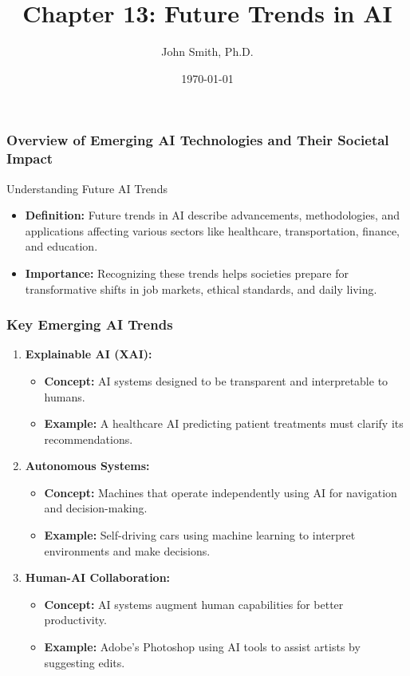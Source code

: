 \documentclass[aspectratio=169]{beamer}
\title[Future Trends in AI]{Chapter 13: Future Trends in AI}
\author[J. Smith]{John Smith, Ph.D.}
\institute[University Name]{
  Department of Computer Science\\
  University Name\\
  \vspace{0.3cm}
  Email: email@university.edu\\
  Website: www.university.edu
}
\date{\today}
\begin{document}
\frame{\titlepage}

\begin{frame}[fragile]
    \titlepage
\end{frame}

\begin{frame}[fragile]
    \frametitle{Overview of Emerging AI Technologies and Their Societal Impact}
    \begin{block}{Understanding Future AI Trends}
        \begin{itemize}
            \item \textbf{Definition:} Future trends in AI describe advancements, methodologies, and applications affecting various sectors like healthcare, transportation, finance, and education.
            \item \textbf{Importance:} Recognizing these trends helps societies prepare for transformative shifts in job markets, ethical standards, and daily living.
        \end{itemize}
    \end{block}
\end{frame}

\begin{frame}[fragile]
    \frametitle{Key Emerging AI Trends}
    \begin{enumerate}
        \item \textbf{Explainable AI (XAI):}
            \begin{itemize}
                \item \textbf{Concept:} AI systems designed to be transparent and interpretable to humans.
                \item \textbf{Example:} A healthcare AI predicting patient treatments must clarify its recommendations.
            \end{itemize}
        
        \item \textbf{Autonomous Systems:}
            \begin{itemize}
                \item \textbf{Concept:} Machines that operate independently using AI for navigation and decision-making.
                \item \textbf{Example:} Self-driving cars using machine learning to interpret environments and make decisions.
            \end{itemize}
        
        \item \textbf{Human-AI Collaboration:}
            \begin{itemize}
                \item \textbf{Concept:} AI systems augment human capabilities for better productivity.
                \item \textbf{Example:} Adobe's Photoshop using AI tools to assist artists by suggesting edits.
            \end{itemize}
    \end{enumerate}
\end{frame}
\end{document}
